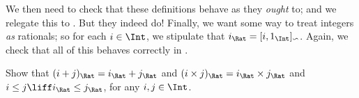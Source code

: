 \documentclass[../../../include/open-logic-section]{subfiles}
\begin{document}
We then need to check that these definitions behave as they
\emph{ought} to; and we relegate this to . But they
indeed do!{} Finally, we want some way to treat integers \emph{as}
rationals; so for each $i \in \Int$, we stipulate that $i_\Rat =
\equivrep{i, 1_\Int}{\Ratequiv}$. Again, we check that all of this
behaves correctly in .

\begin{prob}
Show that $(i + j)_\Rat = i_\Rat+ j_\Rat$ and $(i \times j)_\Rat =
i_\Rat \times j_\Rat$ and $i \leq j \liff i_\Rat \leq j_\Rat$, for any
$i, j \in \Int$.
\end{prob}
\end{document}
